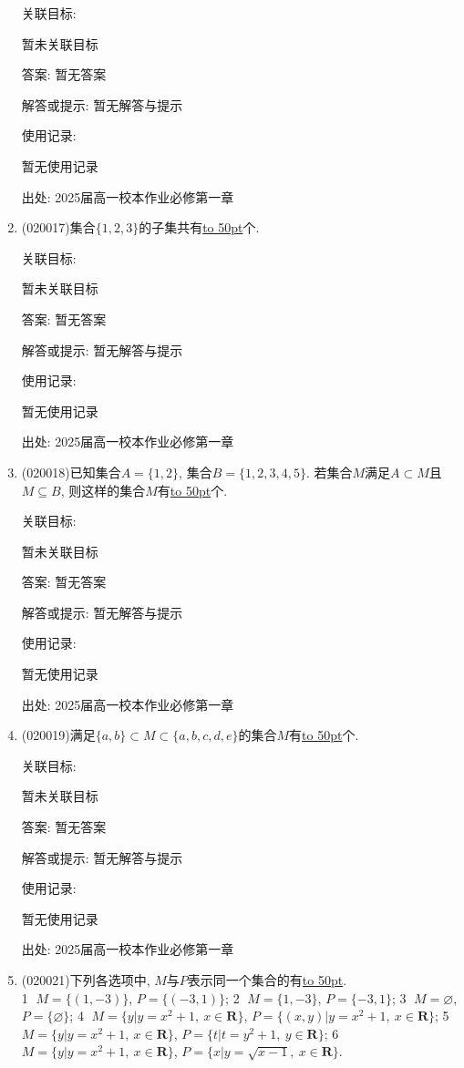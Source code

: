 \documentclass[10pt,a4paper]{article}
\newcommand{\blank}[1]{\underline{\hbox to #1pt{}}}
\begin{document}
\begin{enumerate}[1.]
关联目标:

暂未关联目标

答案: 暂无答案

解答或提示: 暂无解答与提示

使用记录:

暂无使用记录


出处: 2025届高一校本作业必修第一章
\item { (020017)}集合$\{1,2,3\}$的子集共有\blank{50}个.


关联目标:

暂未关联目标

答案: 暂无答案

解答或提示: 暂无解答与提示

使用记录:

暂无使用记录


出处: 2025届高一校本作业必修第一章
\item { (020018)}已知集合$A=\{1,2\}$, 集合$B=\{1,2,3,4,5\}$. 若集合$M$满足$A\subset M$且$M\subseteq B$, 则这样的集合$M$有\blank{50}个.


关联目标:

暂未关联目标

答案: 暂无答案

解答或提示: 暂无解答与提示

使用记录:

暂无使用记录


出处: 2025届高一校本作业必修第一章
\item { (020019)}满足$\{a, b\}\subset M \subset\{a, b, c, d, e\}$的集合$M$有\blank{50}个.


关联目标:

暂未关联目标

答案: 暂无答案

解答或提示: 暂无解答与提示

使用记录:

暂无使用记录


出处: 2025届高一校本作业必修第一章
\item { (020021)}下列各选项中, $M$与$P$表示同一个集合的有\blank{50}.\\
\textcircled{1} $M=\{(1, -3)\}$, $P=\{(-3, 1)\}$; \textcircled{2} $M=\{1, -3\}$, $P=\{-3, 1\}$; \textcircled{3} $M=\varnothing$, $P=\{\varnothing\}$; \textcircled{4} $M=\{y|y=x^2+1, \  x\in\mathbf{R}\}$, $P=\{(x, y)|y=x^2+1, \ x\in\mathbf{R}\}$; \textcircled{5} $M=\{y|y=x^2+1, \  x\in\mathbf{R}\}$, $P=\{t|t=y^2+1, \ y\in\mathbf{R}\}$; \textcircled{6} $M=\{y|y=x^2+1, \  x\in\mathbf{R}\}$, $P=\{x|y=\sqrt{x-1},\  x\in\mathbf{R}\}$.



\end{enumerate}
\end{document}

